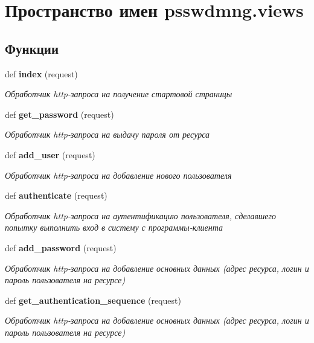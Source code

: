 \section{Пространство имен psswdmng.\+views}
\label{namespacepsswdmng_1_1views}
\subsection*{Функции}
\begin{DoxyCompactItemize}
\item 
\mbox{\label{namespacepsswdmng_1_1views_ac351e00c39da2dbfca96d83f2b25bee0}} 
def \textbf{ index} (request)
\begin{DoxyCompactList}\small\item\em Обработчик http-\/запроса на получение стартовой страницы \end{DoxyCompactList}\item 
def \textbf{ get\+\_\+password} (request)
\begin{DoxyCompactList}\small\item\em Обработчик http-\/запроса на выдачу пароля от ресурса \end{DoxyCompactList}\item 
def \textbf{ add\+\_\+user} (request)
\begin{DoxyCompactList}\small\item\em Обработчик http-\/запроса на добавление нового пользователя \end{DoxyCompactList}\item 
def \textbf{ authenticate} (request)
\begin{DoxyCompactList}\small\item\em Обработчик http-\/запроса на аутентификацию пользователя, сделавшего попытку выполнить вход в систему с программы-\/клиента \end{DoxyCompactList}\item 
def \textbf{ add\+\_\+password} (request)
\begin{DoxyCompactList}\small\item\em Обработчик http-\/запроса на добавление основных данных (адрес ресурса, логин и пароль пользователя на ресурсе) \end{DoxyCompactList}\item 
def \textbf{ get\+\_\+authentication\+\_\+sequence} (request)
\begin{DoxyCompactList}\small\item\em Обработчик http-\/запроса на добавление основных данных (адрес ресурса, логин и пароль пользователя на ресурсе) \end{DoxyCompactList}\item 

\end{DoxyCompactItemize}
